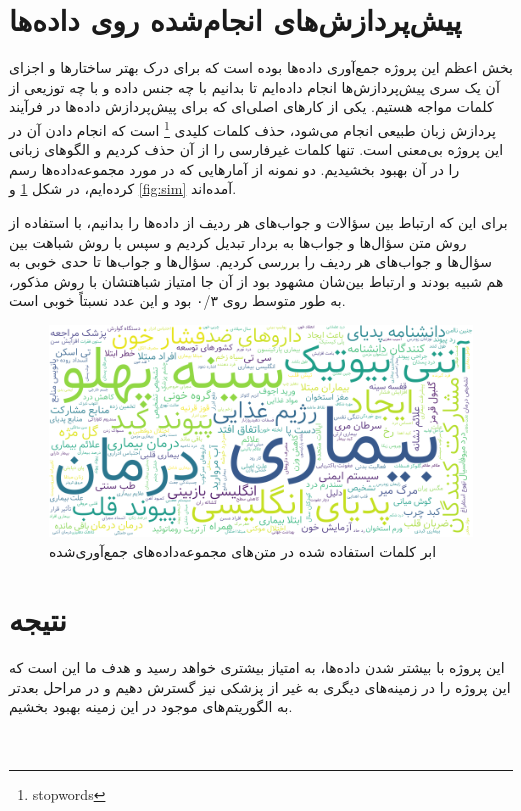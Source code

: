 \documentclass{CCI2020}
\begin{document}






\section{پیش‌پردازش‌های انجام‌شده روی داده‌ها}
بخش اعظم این پروژه جمع‌آوری داده‌ها بوده است که برای درک بهتر ساختارها و اجزای آن یک سری پیش‌پردازش‌ها انجام داده‌ایم تا بدانیم با چه جنس داده و با چه توزیعی از کلمات مواجه هستیم. یکی از کارهای اصلی‌ای که برای پیش‌پردازش داده‌ها در فرآیند پردازش زبان طبیعی انجام می‌شود، حذف کلمات کلیدی \footnote{stopwords} است که انجام دادن آن در این پروژه بی‌معنی است. تنها کلمات غیرفارسی را از آن حذف کردیم و الگوهای زبانی را در آن بهبود بخشیدیم. دو نمونه از آمارهایی که در مورد مجموعه‌داده‌ها رسم کرده‌ایم، در شکل \ref{fig:wc} و \ref{fig:sim} آمده‌اند.

برای این که ارتباط بین سؤالات و جواب‌های هر ردیف از داده‌ها را بدانیم، با استفاده از روش  متن سؤال‌ها و جواب‌ها به بردار تبدیل کردیم و سپس با روش  شباهت بین سؤال‌ها و جواب‌های هر ردیف را بررسی کردیم. سؤال‌ها و جواب‌ها تا حدی خوبی به هم شبیه بودند و ارتباط بین‌شان مشهود بود از آن جا امتیاز شباهتشان با روش مذکور، به طور متوسط روی ۰/۳ بود و این عدد نسبتاً خوبی است.


\begin{figure}[H]
    \centering
    \includegraphics[width=\linewidth]{images/wordcloud.png}
    \caption{ابر کلمات استفاده شده در متن‌های مجموعه‌داده‌های جمع‌آوری‌شده}
    \label{fig:wc}
\end{figure}

\section{نتیجه}
این پروژه با بیشتر شدن داده‌ها، به امتیاز بیشتری خواهد رسید و هدف ما این است که این پروژه را در زمینه‌های دیگری به غیر از پزشکی نیز گسترش دهیم و در مراحل بعدتر به الگوریتم‌های موجود در این زمینه بهبود بخشیم.
\\
\\
\\


%


\end{document}
